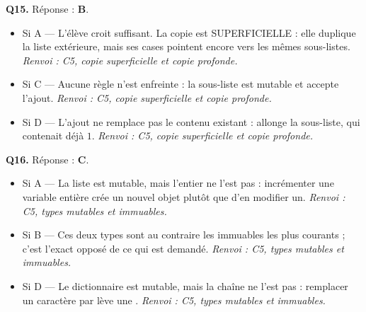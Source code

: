 \textbf{Q15.} Réponse : \textbf{B}.
\begin{itemize}[nosep]
  \item Si A — L'élève croit  suffisant. La copie est SUPERFICIELLE : elle duplique la liste extérieure, mais ses cases pointent encore vers les mêmes sous-listes. \emph{Renvoi : C5, copie superficielle et copie profonde.}
  \item Si C — Aucune règle n'est enfreinte : la sous-liste est mutable et accepte l'ajout. \emph{Renvoi : C5, copie superficielle et copie profonde.}
  \item Si D — L'ajout ne remplace pas le contenu existant :  allonge la sous-liste, qui contenait déjà $1$. \emph{Renvoi : C5, copie superficielle et copie profonde.}
\end{itemize}

\textbf{Q16.} Réponse : \textbf{C}.
\begin{itemize}[nosep]
  \item Si A — La liste est mutable, mais l'entier ne l'est pas : incrémenter une variable entière crée un nouvel objet plutôt que d'en modifier un. \emph{Renvoi : C5, types mutables et immuables.}
  \item Si B — Ces deux types sont au contraire les immuables les plus courants ; c'est l'exact opposé de ce qui est demandé. \emph{Renvoi : C5, types mutables et immuables.}
  \item Si D — Le dictionnaire est mutable, mais la chaîne ne l'est pas : remplacer un caractère par  lève une . \emph{Renvoi : C5, types mutables et immuables.}
\end{itemize}
